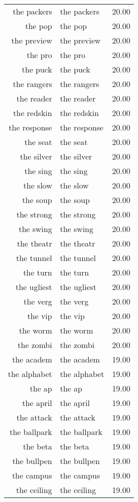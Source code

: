 \begin{table}[ht]
\begin{tabular}{rlr}
  the packers & the packers & 20.00 \\ 
  the pop & the pop & 20.00 \\ 
  the preview & the preview & 20.00 \\ 
  the pro & the pro & 20.00 \\ 
  the puck & the puck & 20.00 \\ 
  the rangers & the rangers & 20.00 \\ 
  the reader & the reader & 20.00 \\ 
  the redskin & the redskin & 20.00 \\ 
  the response & the response & 20.00 \\ 
  the seat & the seat & 20.00 \\ 
  the silver & the silver & 20.00 \\ 
  the sing & the sing & 20.00 \\ 
  the slow & the slow & 20.00 \\ 
  the soup & the soup & 20.00 \\ 
  the strong & the strong & 20.00 \\ 
  the swing & the swing & 20.00 \\ 
  the theatr & the theatr & 20.00 \\ 
  the tunnel & the tunnel & 20.00 \\ 
  the turn & the turn & 20.00 \\ 
  the ugliest & the ugliest & 20.00 \\ 
  the verg & the verg & 20.00 \\ 
  the vip & the vip & 20.00 \\ 
  the worm & the worm & 20.00 \\ 
  the zombi & the zombi & 20.00 \\ 
  the academ & the academ & 19.00 \\ 
  the alphabet & the alphabet & 19.00 \\ 
  the ap & the ap & 19.00 \\ 
  the april & the april & 19.00 \\ 
  the attack & the attack & 19.00 \\ 
  the ballpark & the ballpark & 19.00 \\ 
  the beta & the beta & 19.00 \\ 
  the bullpen & the bullpen & 19.00 \\ 
  the campus & the campus & 19.00 \\ 
  the ceiling & the ceiling & 19.00 \\ 

\end{tabular}
\end{table}
